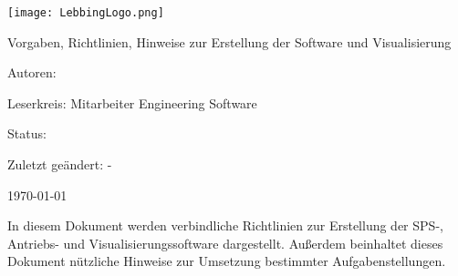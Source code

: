 \begin{titlepage}

    
    \begin{center} 
    \texttt{[image: LebbingLogo.png]}
    \par\vspace{1.5cm}
    {\scshape\Large \company\par}
    \vspace{2cm}
    
    {\Huge\textbf{\titlename}\par}
    \vspace{0.5cm}
    {\Large Vorgaben, Richtlinien, Hinweise zur Erstellung der Software und Visualisierung\par}
    \vspace{1.5cm}
\end{center}
    
        {Autoren:   \authorname~\par}
        {Leserkreis:  Mitarbeiter Engineering Software \par}
        {Status:   \state\par}
        {Zuletzt geändert:   \lasteditor -\par}
        {\company\par}
        {\today\par}        

        \vspace{3cm}
        \noindent In diesem Dokument werden verbindliche Richtlinien zur Erstellung der SPS-, Antriebs- und Visualisierungssoftware dargestellt. Außerdem beinhaltet dieses Dokument nützliche Hinweise zur Umsetzung bestimmter Aufgabenstellungen.
    
    \end{titlepage}